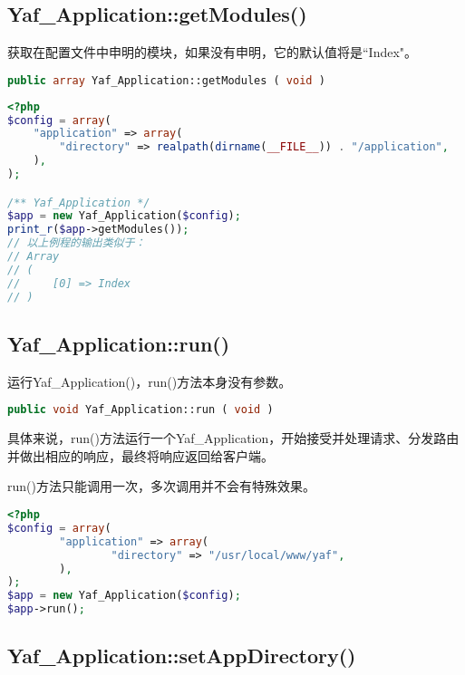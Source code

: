 \subsection{Yaf\_Application::getModules()}

获取在配置文件中申明的模块，如果没有申明，它的默认值将是``Index"。





\begin{lstlisting}[language=PHP]
public array Yaf_Application::getModules ( void )
\end{lstlisting}

\begin{lstlisting}[language=PHP]
<?php
$config = array(
    "application" => array(
        "directory" => realpath(dirname(__FILE__)) . "/application",
    ),
);

/** Yaf_Application */
$app = new Yaf_Application($config);
print_r($app->getModules());
// 以上例程的输出类似于：
// Array
// (
//     [0] => Index
// )
\end{lstlisting}


\subsection{Yaf\_Application::run()}

运行Yaf\_Application()，run()方法本身没有参数。





\begin{lstlisting}[language=PHP]
public void Yaf_Application::run ( void )
\end{lstlisting}

具体来说，run()方法运行一个Yaf\_Application，开始接受并处理请求、分发路由并做出相应的响应，最终将响应返回给客户端。

run()方法只能调用一次，多次调用并不会有特殊效果。

\begin{lstlisting}[language=PHP]
<?php
$config = array(
        "application" => array(
                "directory" => "/usr/local/www/yaf",
        ),
);
$app = new Yaf_Application($config);
$app->run();
\end{lstlisting}


\subsection{Yaf\_Application::setAppDirectory()}

